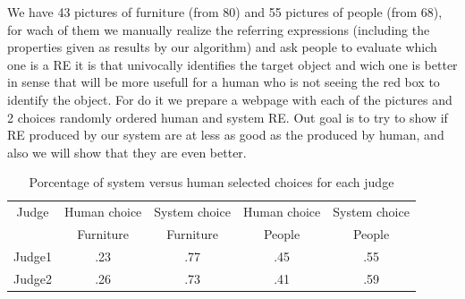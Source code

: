 We have 43 pictures of furniture (from 80) and 55 pictures of people (from 68), for wach of them we manually realize the referring expressions (including the properties given as results by our algorithm) and ask people to evaluate which one is a RE it is that univocally identifies the target object and wich one is better in sense that will be more usefull for a human who is not seeing the red box to identify the object. For do it we prepare a webpage with each of the pictures and 2 choices randomly ordered human and system RE. Out goal is to try to show if RE produced by our system are at less as good as the produced by human, and also we will show that they are even better.



\begin{table}[h!]
\begin{center}
\begin{tabular}{|c|c|c|c|c|}
\hline
Judge    & Human choice & System choice  & Human choice & System choice \\
	 &    Furniture &    Furniture   &    People    &    People \\
\hline 
Judge1   & .23       & .77      & .45  & .55  \\
Judge2   & .26       & .73      & .41  & .59  \\
\hline
\end{tabular}
\caption{Porcentage of system versus human selected choices for each judge} 
\label{system-versus-human}
\end{center}
\end{table}

